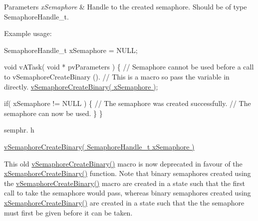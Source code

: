 \begin{DoxyParams}{Parameters}
{\em x\+Semaphore} & Handle to the created semaphore. Should be of type Semaphore\+Handle\+\_\+t.\\
\hline
\end{DoxyParams}
Example usage\+: 
\begin{DoxyPre}
SemaphoreHandle\_t xSemaphore = NULL;\end{DoxyPre}



\begin{DoxyPre}void vATask( void * pvParameters )
\{
 // Semaphore cannot be used before a call to vSemaphoreCreateBinary ().
 // This is a macro so pass the variable in directly.
 \hyperlink{vendor_2ceedling_2plugins_2freertos_2src_2freertos_2include_2semphr_8h_ae10bffadd26fbd5bcce76bf33a83ef30}{vSemaphoreCreateBinary( xSemaphore )};\end{DoxyPre}



\begin{DoxyPre} if( xSemaphore != NULL )
 \{
     // The semaphore was created successfully.
     // The semaphore can now be used.
 \}
\}
\end{DoxyPre}


semphr. h 
\begin{DoxyPre}\hyperlink{vendor_2ceedling_2plugins_2freertos_2src_2freertos_2include_2semphr_8h_ae10bffadd26fbd5bcce76bf33a83ef30}{vSemaphoreCreateBinary( SemaphoreHandle\_t xSemaphore )}\end{DoxyPre}


This old \hyperlink{vendor_2ceedling_2plugins_2freertos_2src_2freertos_2include_2semphr_8h_ae10bffadd26fbd5bcce76bf33a83ef30}{v\+Semaphore\+Create\+Binary()} macro is now deprecated in favour of the \hyperlink{vendor_2ceedling_2plugins_2freertos_2src_2freertos_2include_2semphr_8h_acba963695e4f159d9bfa2394cae5badc}{x\+Semaphore\+Create\+Binary()} function. Note that binary semaphores created using the \hyperlink{vendor_2ceedling_2plugins_2freertos_2src_2freertos_2include_2semphr_8h_ae10bffadd26fbd5bcce76bf33a83ef30}{v\+Semaphore\+Create\+Binary()} macro are created in a state such that the first call to \textquotesingle{}take\textquotesingle{} the semaphore would pass, whereas binary semaphores created using \hyperlink{vendor_2ceedling_2plugins_2freertos_2src_2freertos_2include_2semphr_8h_acba963695e4f159d9bfa2394cae5badc}{x\+Semaphore\+Create\+Binary()} are created in a state such that the the semaphore must first be \textquotesingle{}given\textquotesingle{} before it can be \textquotesingle{}taken\textquotesingle{}.

